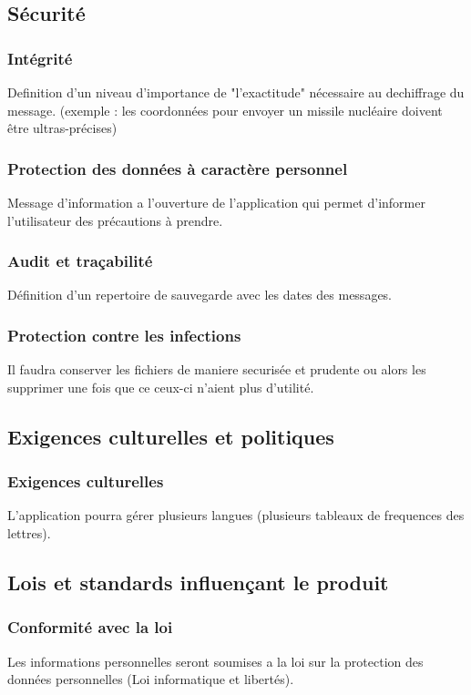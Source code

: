 \documentclass[a4]{article}
\begin{document}
		\subsection{Sécurité}
			\subsubsection {Intégrité}
				Definition d'un niveau d'importance de "l'exactitude" nécessaire au dechiffrage du message.
				(exemple : les coordonnées pour envoyer un missile nucléaire doivent être ultras-précises)
			\subsubsection {Protection des données à caractère personnel}
				Message d'information a l'ouverture de l'application qui permet d'informer l'utilisateur des 					précautions à prendre.
			\subsubsection {Audit et traçabilité}
				Définition d'un repertoire de sauvegarde avec les dates des messages.
			\subsubsection {Protection contre les infections}
				Il faudra conserver les fichiers de maniere securisée et prudente ou alors les supprimer une 					fois que ce ceux-ci n'aient plus d'utilité.
		\subsection{Exigences culturelles et politiques}
			\subsubsection {Exigences culturelles}
				L'application pourra gérer plusieurs langues (plusieurs tableaux de frequences des lettres).
		\subsection{Lois et standards influençant le produit}
			\subsubsection {Conformité avec la loi}
				Les informations personnelles seront soumises a la loi sur la protection des données
				personnelles (Loi informatique et libertés).
\end{document}
